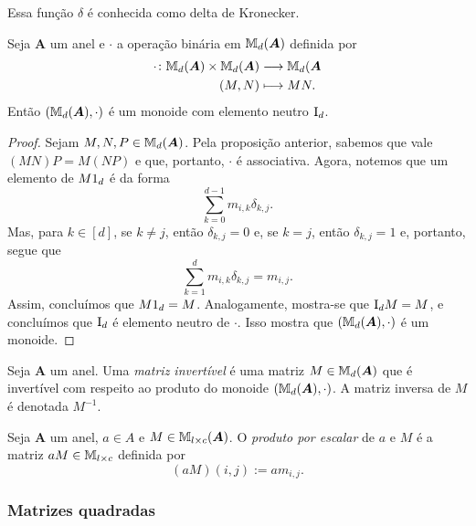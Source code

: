 Essa função $\delta$ é conhecida como delta de Kronecker.

\begin{proposition}
	Seja $\bm A$ um anel e $\cdot$ a operação binária em $\mathbb{M}_d(\bm A)$ definida por
	\begin{align*}
	{\cdot}\colon {\mathbb{M}_d(\bm A) \times \mathbb{M}_d(\bm A)} &\longrightarrow {\mathbb{M}_d(\bm A} \\{(M,N)} &\longmapsto MN.
	\end{align*}
Então $(\mathbb{M}_d(\bm A),\cdot)$ é um monoide com elemento neutro $\mathrm{I}_d$.
\end{proposition}
\begin{proof}
	Sejam $M,N,P \in \mathbb{M}_d(\bm A)$. Pela proposição anterior, sabemos que vale $(MN)P=M(NP)$ e que, portanto, $\cdot$ é associativa. Agora, notemos que um elemento de $M1_d$ é da forma
	\begin{equation*}
	\sum_{k=0}^{d-1} m_{i,k}\delta_{k,j}.
	\end{equation*}
Mas, para $k \in [d]$, se $k \neq j$, então $\delta_{k,j}=0$ e, se $k=j$, então $\delta_{k,j}=1$ e, portanto, segue que
	\begin{equation*}
	\sum_{k=1}^d m_{i,k}\delta_{k,j} = m_{i,j}.
	\end{equation*}
Assim, concluímos que $M1_d=M$. Analogamente, mostra-se que $\mathrm{I}_dM=M$, e concluímos que $\mathrm{I}_d$ é elemento neutro de $\cdot$. Isso mostra que $(\mathbb{M}_d(\bm A),\cdot)$ é um monoide.
\end{proof}

\begin{definition}
	Seja $\bm A$ um anel. Uma \emph{matriz invertível} é uma matriz $M \in \mathbb{M}_d(\bm A)$ que é invertível com respeito ao produto do monoide $(\mathbb{M}_d(\bm A),\cdot)$. A matriz inversa de $M$ é denotada $M^{-1}$.
\end{definition}

\begin{definition}
	Seja $\bm A$ um anel, $a \in A$ e $M \in \mathbb{M}_{l \times c}(\bm A)$. O \emph{produto por escalar} de $a$ e $M$ é a matriz $aM \in \mathbb{M}_{l \times c}$ definida por
	\begin{equation*}
	(aM)(i,j) := am_{i,j}.
	\end{equation*}
\end{definition}

\subsubsection{Matrizes quadradas}

